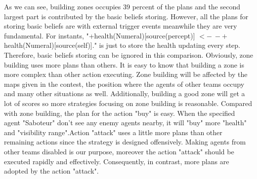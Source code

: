 \documentclass{llncs}
\begin{document}
As we can see, building zones occupies 39 percent of the plans and the second largest part is contributed by the basic beliefs storing. However, all the plans for storing basic beliefs are with external trigger events meanwhile they are very fundamental. For instants, "+health(Numeral)[source(percept)] $<- \ -+$health(Numeral)[source(self)]." is just to store the health updating every step. Therefore, basic beliefs storing can be ignored in this comparison. Obviously, zone building uses more plans than others. It is easy to know that building a zone is more complex than other action executing. Zone building will be affected by the maps given in the contest, the position where the agents of other teams occupy and many other situations as well. Additionally, building a good zone will get a lot of scores so more strategies focusing on zone building is reasonable. Compared with zone building, the plan for the action "buy" is easy. When the specified agent "Saboteur" don't see any enemy agents nearby, it will "buy" more "health" and "visibility range".Action "attack" uses a little more plans than other remaining actions since the strategy is designed offensively. Making agents from other teams disabled is our purpose, moreover the action "attack" should be executed rapidly and effectively. Consequently, in contrast, more plans are adopted by the action "attack".
\end{document}
